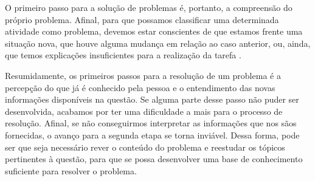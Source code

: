 O primeiro passo para a solução de problemas é, portanto, a compreensão do próprio problema. Afinal, para que possamos classificar uma determinada atividade como problema, devemos estar conscientes de que estamos frente uma situação nova, que houve alguma mudança em relação ao caso anterior, ou, ainda, que temos explicações insuficientes para a realização da tarefa \cite{Echeverria1998}. 

Resumidamente, os primeiros passos para a resolução de um problema é a percepção do que já é conhecido pela pessoa e o entendimento das novas informações disponíveis na questão. Se alguma parte desse passo não puder ser desenvolvida, acabamos por ter uma dificuldade a mais para o processo de resolução. Afinal, se não conseguirmos interpretar as informações que nos sãos fornecidas, o avanço para a segunda etapa se torna inviável. Dessa forma, pode ser que seja necessário rever o conteúdo do problema e reestudar os tópicos pertinentes à questão, para que se possa desenvolver uma base de conhecimento suficiente para resolver o problema. 

